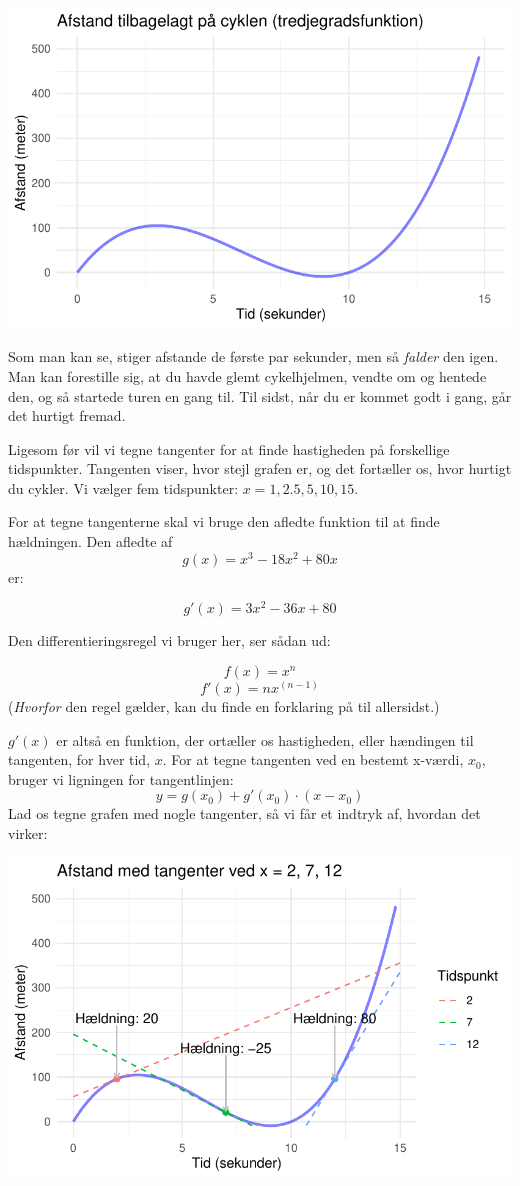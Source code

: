 \documentclass[
  letterpaper,
  DIV=11,
  numbers=noendperiod]{scrreprt}
\begin{document}
\includegraphics{differentialregning_files/figure-pdf/unnamed-chunk-1-1.pdf}

Som man kan se, stiger afstande de første par sekunder, men så
\emph{falder} den igen. Man kan forestille sig, at du havde glemt
cykelhjelmen, vendte om og hentede den, og så startede turen en gang
til. Til sidst, når du er kommet godt i gang, går det hurtigt fremad.

Ligesom før vil vi tegne tangenter for at finde hastigheden på
forskellige tidspunkter. Tangenten viser, hvor stejl grafen er, og det
fortæller os, hvor hurtigt du cykler. Vi vælger fem tidspunkter:
\(x=1, 2.5, 5, 10, 15\).

For at tegne tangenterne skal vi bruge den afledte funktion til at finde
hældningen. Den afledte af \[ g(x) = x^3 - 18x^2 + 80x \] er:

\[ g'(x) = 3x^2 - 36x + 80 \]

Den differentieringsregel vi bruger her, ser sådan ud:

\[ f(x) = x^n \] \[ f'(x) = nx^{(n-1)} \] (\emph{Hvorfor} den regel
gælder, kan du finde en forklaring på til allersidst.)

\(g'(x)\) er altså en funktion, der ortæller os hastigheden, eller
hændingen til tangenten, for hver tid, \(x\). For at tegne tangenten ved
en bestemt x-værdi, \(x_0\), bruger vi ligningen for tangentlinjen:
\[ y = g(x_0) + g'(x_0) \cdot (x - x_0) \] Lad os tegne grafen med nogle
tangenter, så vi får et indtryk af, hvordan det virker:

\includegraphics{differentialregning_files/figure-pdf/unnamed-chunk-2-1.pdf}
\end{document}
